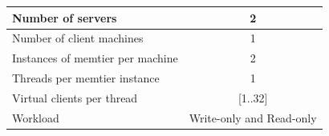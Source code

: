 \documentclass[11pt,a4paper]{article}
\begin{document}
\begin{center}
	\scriptsize{
		\begin{tabular}{|l|c|}
			\hline Number of servers                & 2                        \\ 
			\hline Number of client machines        & 1                        \\ 
			\hline Instances of memtier per machine & 2                        \\ 
			\hline Threads per memtier instance     & 1                        \\
			\hline Virtual clients per thread       & [1..32]                  \\ 
			\hline Workload                         & Write-only and Read-only \\
			\hline 
		\end{tabular}
	} 
\end{center}
\end{document}
